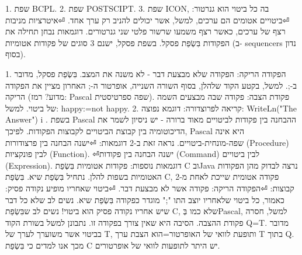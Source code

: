 \begin{טבלא}[!htbp]
        1. שפת BCPL.
        2. שפת POSTSCIPT.
        3. שפת ICON, בה כל ביטוי הוא גנרטור:
⏎ביטויים אטומים הם ערכים, למשל, אשר יכולים להניב רק ערך אחד.
⏎איטרציות מניבות רצף של ערכים, כאשר רצף משמעו שרשור פלטי שני גנרטורים.
        דוגמאות
        נבחן תחילה את הפקודות בִּשְׂפַת פסקל.
        בשפת פסקל, ישנם 3 סוגים של פקודות אטומיות (ב- sequencers נדון בסוף).

        1. הפקודה הריקה: הפקודה שלא מבצעת דבר - לא משנה את המצב. בִּשְׂפַת פסקל, מדובר ב-;. למשל, בקטע הקוד שלהלן, בסוף השורה השנייה, אופרטור ה-; האחרון מציין את הפקודה הריקה (מדוע? רמז: Pascal שפה ספרטיסטית). פקודת הצבה: פקודה שבה מבצעים השמה של ביטוי. למשל: happy:=not happy.
        2. קריאה לפרוצדורה: דוגמא נפוצה: WriteLn("The Answer") i .
        בשפת Pascal ההבחנה בין פקודות לביטויים מאוד ברורה - יש ניסיון לשמר את הדיכוטומיה בין קבוצת הביטויים לקבוצות הפקודות. לפיכך, Pascal היא אינה שפה-מונחית-ביטויים. נראה זאת ב-2 דוגמאות:
⏎ישנה הבחנה בין פרצודורות (Procedure) לבין פונקציות (Function).
⏎ישנה הבחנה בין פקודות (Command) לבין ביטויים (Expression).
        דוגמאות נוספות: פקודות אטומיות בִּשְׂפַת C ובJava
        נרצה לבדוק מהן הפקודות האטומיות בשפות להלן. נתחיל בִּשְׂפַת שיא.
        בִּשְׂפַת C, פקודה אטומית שייכת לאחת מ-2 קבוצות:
⏎הפקודה הריקה: פקודה אשר לא מבצעת דבר.
⏎ביטוי שאחריו מופיע נקודה פסיק: כאמור, כל ביטוי שלאחריו יוצב התו ";" מוגדר כפקודה בִּשְׂפַת שיא. נשים לב שלא כל דבר שיש אחריו נקודה פסיק הוא ביטוי!
        נשים לב שבִּשְׂפַת C, שלא כמו בְּPascal, למשל, חסרה פקודת ההצבה. הסיבה היא שאין צורך בפקודה זו. נתבונן למשל בשורת הקוד Q=T. מדובר בביטוי אשר משוערך לערך של T, ותופעת לוואי של האופרטור=הוא הצבת ערך T בתוך Q. מכך אנו למדים כי בִּשְׂפַת C יש היתר לתופעות לוואי של אופרטורים.


\end{טבלא}
